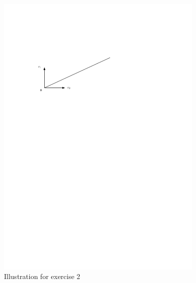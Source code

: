 \documentclass[12pt,a4paper]{article}
\theoremstyle{plain}
\theoremstyle{definition}
\begin{document}
  \begin{figure}[h]
    \begin{center}
    \includegraphics[width=10cm]{Figure2.pdf}
    \caption{Illustration for exercise 2}
          
    \end{center}

  \end{figure}
\end{document}
